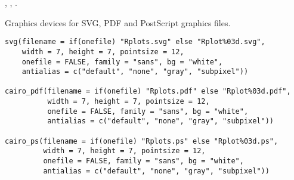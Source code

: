 %
\begin{SeeAlso}\relax
{}, , .
\end{SeeAlso}
%
\begin{Examples}
\end{Examples}
%
\begin{Description}\relax
Graphics devices for SVG, PDF and PostScript graphics files.
\end{Description}
%
\begin{Usage}
\begin{verbatim}
svg(filename = if(onefile) "Rplots.svg" else "Rplot%03d.svg",
    width = 7, height = 7, pointsize = 12,
    onefile = FALSE, family = "sans", bg = "white",
    antialias = c("default", "none", "gray", "subpixel"))

cairo_pdf(filename = if(onefile) "Rplots.pdf" else "Rplot%03d.pdf",
          width = 7, height = 7, pointsize = 12,
          onefile = FALSE, family = "sans", bg = "white",
          antialias = c("default", "none", "gray", "subpixel"))

cairo_ps(filename = if(onefile) "Rplots.ps" else "Rplot%03d.ps",
         width = 7, height = 7, pointsize = 12,
         onefile = FALSE, family = "sans", bg = "white",
         antialias = c("default", "none", "gray", "subpixel"))
\end{verbatim}
\end{Usage}
%
